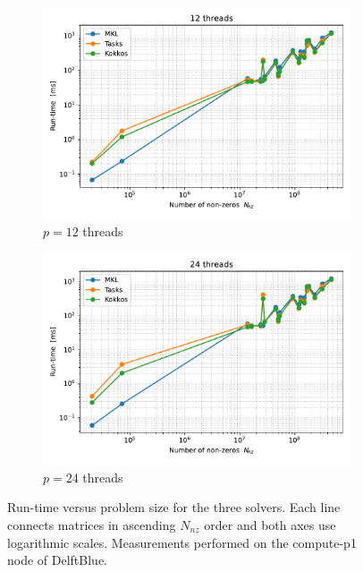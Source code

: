 \begin{figure}
\begin{subfigure}[t]{0.49\linewidth}
    \includegraphics[width=\linewidth]{report/figures/results/runtime_vs_nnz_12.pdf}
    \caption{$p=12$ threads}
  \end{subfigure}
  \begin{subfigure}[t]{0.49\linewidth}
    \centering
    \includegraphics[width=\linewidth]{report/figures/results/runtime_vs_nnz_24.pdf}
    \caption{$p=24$ threads}
  \end{subfigure}
  \caption{Run-time versus problem size for the three solvers.
           Each line connects matrices in ascending $N_{nz}$ order and both axes use logarithmic scales. Measurements performed on the compute-p1 node of DelftBlue.}
  \label{fig:runtime_vs_nnz_grid}
\end{figure}


